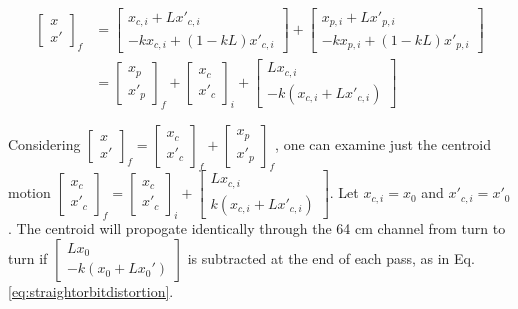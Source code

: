 \begin{equation}
\begin{split}
\begin{bmatrix} x \\ x' \end{bmatrix}_f 
&= \begin{bmatrix} x_{c,i} + Lx'_{c,i} \\ -kx_{c,i} + (1-kL)x'_{c,i} \end{bmatrix} + \begin{bmatrix} x_{p,i} + Lx'_{p,i} \\ -kx_{p,i} + (1-kL)x'_{p,i} \end{bmatrix} \\
&=\begin{bmatrix} x_p \\ x'_p \end{bmatrix}_f + \begin{bmatrix} x_c \\ x'_c \end{bmatrix}_i + \begin{bmatrix} L x_{c,i} \\ -k(x_{c,i} + Lx'_{c,i}) \end{bmatrix}
\end{split}
\end{equation}

Considering $\begin{bmatrix} x \\ x' \end{bmatrix}_f = \begin{bmatrix} x_c \\ x'_c \end{bmatrix}_f + \begin{bmatrix} x_p \\ x'_p \end{bmatrix}_f$, one can examine just the centroid motion $\begin{bmatrix} x_c \\ x'_c \end{bmatrix}_f = \begin{bmatrix} x_c \\ x'_c \end{bmatrix}_i + \begin{bmatrix} L x_{c,i} \\ k(x_{c,i} + Lx'_{c,i}) \end{bmatrix}$. Let $x_{c,i} = x_0$ and $x'_{c,i} = x'_0$. The centroid will propogate identically through the 64 cm channel from turn to turn if $\begin{bmatrix} L x_0 \\ -k(x_0 + Lx_0') \end{bmatrix}$ is subtracted at the end of each pass, as in Eq. \ref{eq:straightorbitdistortion}.

